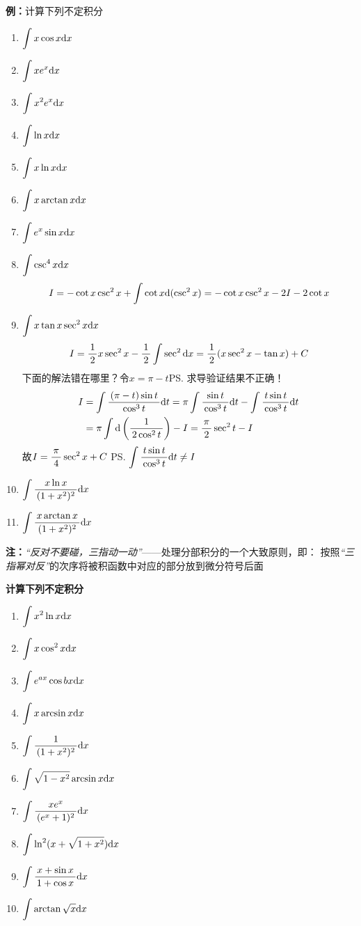 {\bf 例：}计算下列不定积分
\begin{enumerate}[(1)]
  \setlength{\itemindent}{1cm}
  \item $\dint x\cos x\d x$ 
  \item $\dint xe^x\d x$ 
  \item $\dint x^2e^x\d x$ 
  \item $\dint\ln x\d x$
  \item $\dint x\ln x\d x$ 
  \item $\dint x\arctan x\d x$ 
  \item $\dint e^x\sin x\d x$
  \item $\dint\csc^4x\d x$\\
  $$I=-\cot x\csc^2x+\dint\cot x\d(\csc^2x)=-\cot x\csc^2x-2I-2\cot x$$
  \item $\dint x\tan x\sec^2x\d x$
  $$I=\df12x\sec^2x-\df12\dint\sec^2\d x=\df12(x\sec^2x-\tan x)+C$$
  下面的解法错在哪里？令$x=\pi-t$\ps{求导验证结果不正确！}{\b
  \begin{align}
  I&=\dint\df{(\pi-t)\sin t}{\cos^3t}\d t=\pi\dint\df{\sin t}{\cos^3t}\d t
  -\dint\df{t\sin t}{\cos^3t}\d t\notag\\
  &=\pi\dint\d\left(\df1{2\cos^2t}\right)-I=\df{\pi}2\sec^2t-I\notag
  \end{align}
  故$I=\df{\pi}4\sec^2x+C$}
  \ps{$\dint\df{t\sin t}{\cos^3t}\d t\ne I$}
  \item $\dint\df{x\ln x}{(1+x^2)^2}\d x$
  \item $\dint\df{x\arctan x}{(1+x^2)^2}\d x$
\end{enumerate}

{\bf 注：}{\b {\it “{反对}不要碰，{三指}动一动”}——处理分部积分的一个大致原则，即：
按照{\it {“三指幂对反”}}的次序将被积函数中对应的部分放到微分符号后面}

\begin{ext}
	{\bf 计算下列不定积分}
	
	\begin{enumerate}
	  \item $\dint x^2\ln x\d x$
	  \item $\dint x\cos^2x\d x$
	  \item $\dint e^{ax}\cos bx\d x$
	  \item $\dint x\arcsin x\d x$
	  \item $\dint\df1{(1+x^2)^2}\d x$
	  \item $\dint\sqrt{1-x^2}\arcsin x\d x$
	  \item $\dint\df{xe^x}{(e^x+1)^2}\d x$
	  \item $\dint\ln^2(x+\sqrt{1+x^2})\d x$
	  \item $\dint\df{x+\sin x}{1+\cos x}\d x$
	  \item $\dint\arctan\sqrt{x}\d x$
	\end{enumerate}
\end{ext}

